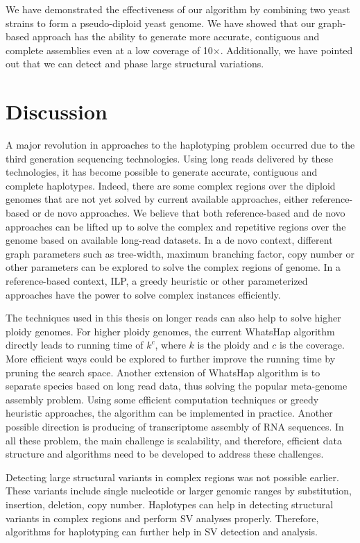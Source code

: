 We have demonstrated the effectiveness of our algorithm by combining two yeast strains to form a pseudo-diploid yeast genome.
We have showed that our graph-based approach has the ability to generate more accurate, contiguous and complete assemblies even at a low coverage of 10$\times$.
Additionally, we have pointed out that we can detect and phase large structural variations.

\section{Discussion}
A major revolution in approaches to the haplotyping problem occurred due to the third generation sequencing technologies.
Using long reads delivered by these technologies, it has become possible to generate accurate, contiguous and complete haplotypes.
Indeed, there are some complex regions over the diploid genomes that are not yet solved by current available approaches, either reference-based or de novo approaches.
We believe that both reference-based and de novo approaches can be lifted up to solve the complex and repetitive regions over the genome based on available long-read datasets.
In a de novo context, different graph parameters such as tree-width, maximum branching factor, copy number or other parameters can be explored to solve the complex regions of genome.
In a reference-based context, ILP, a greedy heuristic or other parameterized approaches have the power to solve complex instances efficiently.

The techniques used in this thesis on longer reads can also help to solve higher ploidy genomes. For higher ploidy genomes, the current WhatsHap algorithm directly leads to running time of $k^c$, where $k$ is the ploidy and $c$ is the coverage.
More efficient ways could be explored to further improve the running time by pruning the search space.
Another extension of WhatsHap algorithm is to separate species based on long read data, thus solving the popular meta-genome assembly problem.
Using some efficient computation techniques or greedy heuristic approaches, the algorithm can be implemented in practice. 
Another possible direction is producing of transcriptome
assembly of RNA sequences. In all these problem, the main challenge is scalability, and therefore, efficient data structure and algorithms need to be developed to address these challenges.

Detecting large structural variants in complex regions was not possible earlier.
These variants include single nucleotide or larger genomic ranges by substitution, insertion, deletion, copy number. 
Haplotypes can help in detecting structural variants in complex regions and perform SV analyses properly.
Therefore, algorithms for haplotyping can further help in SV detection and analysis.

